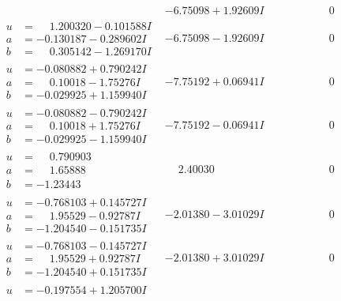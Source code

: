 \documentclass[1p]{elsarticle_modified}
\theoremstyle{definition}
\begin{document}
$$\begin{array}{c|c|c}
 & -6.75098 + 1.92609 I & \phantom{-0.000000 } 0 \\ \hline\begin{aligned}
u &= \phantom{-}1.200320 - 0.101588 I \\
a &= -0.130187 - 0.289602 I \\
b &= \phantom{-}0.305142 - 1.269170 I\end{aligned}
 & -6.75098 - 1.92609 I & \phantom{-0.000000 } 0 \\ \hline\begin{aligned}
u &= -0.080882 + 0.790242 I \\
a &= \phantom{-}0.10018 - 1.75276 I \\
b &= -0.029925 + 1.159940 I\end{aligned}
 & -7.75192 + 0.06941 I & \phantom{-0.000000 } 0 \\ \hline\begin{aligned}
u &= -0.080882 - 0.790242 I \\
a &= \phantom{-}0.10018 + 1.75276 I \\
b &= -0.029925 - 1.159940 I\end{aligned}
 & -7.75192 - 0.06941 I & \phantom{-0.000000 } 0 \\ \hline\begin{aligned}
u &= \phantom{-}0.790903\phantom{ +0.000000I} \\
a &= \phantom{-}1.65888\phantom{ +0.000000I} \\
b &= -1.23443\phantom{ +0.000000I}\end{aligned}
 & \phantom{-}2.40030\phantom{ +0.000000I} & \phantom{-0.000000 } 0 \\ \hline\begin{aligned}
u &= -0.768103 + 0.145727 I \\
a &= \phantom{-}1.95529 - 0.92787 I \\
b &= -1.204540 - 0.151735 I\end{aligned}
 & -2.01380 - 3.01029 I & \phantom{-0.000000 } 0 \\ \hline\begin{aligned}
u &= -0.768103 - 0.145727 I \\
a &= \phantom{-}1.95529 + 0.92787 I \\
b &= -1.204540 + 0.151735 I\end{aligned}
 & -2.01380 + 3.01029 I & \phantom{-0.000000 } 0 \\ \hline\begin{aligned}
u &= -0.197554 + 1.205700 I \\

\end{aligned}
\end{array}$$
\end{document}
